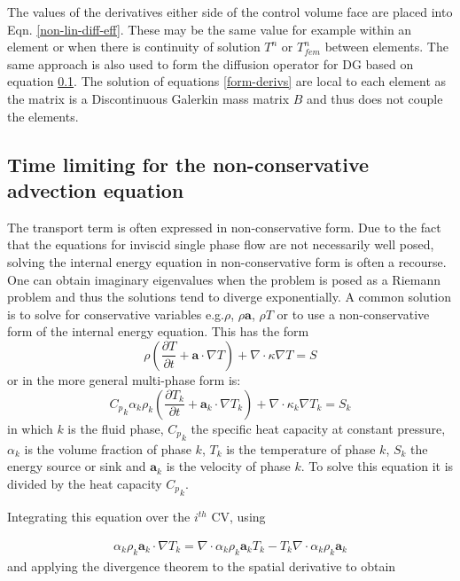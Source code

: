 The values of the derivatives either side of the control volume face are placed into Eqn. \ref{non-lin-diff-eff}. These may be the same value for example within an element or when there is continuity of solution $T^n$ or $T_{fem}^n$ between elements. The same approach is also used to form the diffusion operator for DG based on equation \ref{}.  The solution of equations \ref{form-derivs} are local to each element as
the matrix is a Discontinuous Galerkin mass matrix $B$ and
thus does not couple the elements.




\subsection{Time limiting for the non-conservative advection equation}

The transport term is often expressed in non-conservative form. Due to the fact that the equations for inviscid single phase flow are not necessarily well posed, solving the internal energy equation in non-conservative form is often a recourse.  One can obtain imaginary eigenvalues when the problem is posed as a Riemann problem and thus the solutions tend to diverge exponentially. A common solution is to solve for conservative variables e.g.$\rho$, $\rho\mathbf{a}$, $\rho T$ or to use a non-conservative form of the internal energy equation. This has the form
\begin{equation}
\rho \left( \frac{\partial T}{\partial t} + \mathbf{a}\cdot\nabla
T \right) + \nabla \cdot \kappa\nabla T  = S
\end{equation}
or in the more general multi-phase form is:
\begin{equation}
{C_p}_k \alpha_k \rho_k \left( \frac{\partial T_k}{\partial t} + \mathbf{a}_k\cdot\nabla
T_k \right) + \nabla \cdot \kappa_k \nabla T_k  = S_k
\label{multiT}
\end{equation}
in which $k$ is the fluid phase, ${C_p}_k$ the specific heat capacity at constant pressure, $\alpha_k$ is the volume fraction of phase $k$, $T_k$ is the temperature of phase $k$, $S_k$ the energy source or sink and $\mathbf{a}_k$ is the velocity of phase $k$. To solve this equation it is divided by the heat capacity ${C_p}_k$.

Integrating this equation over the $i^{th}$ CV, using

\begin{eqnarray}
\alpha_k \rho_k
\mathbf{a}_k \cdot \nabla T_k = \nabla \cdot \alpha_k\rho_k \mathbf{a}_k T_k - T_k\nabla\cdot \alpha_k \rho_k \mathbf{a}_k
\label{parts}
\end{eqnarray}
and applying the divergence theorem to the spatial derivative to obtain

